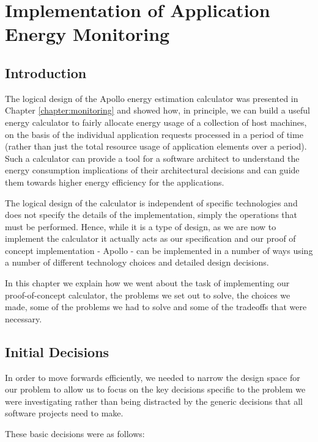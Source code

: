 \chapter{Implementation of Application Energy Monitoring}
\label{chapter:implementation}

\section{Introduction}
The logical design of the Apollo energy estimation calculator was presented in Chapter \ref{chapter:monitoring} and showed how, in principle, we can build a useful energy calculator to fairly allocate energy usage of a collection of host machines, on the basis of the individual application requests processed in a period of time (rather than just the total resource usage of application elements over a period).   Such a calculator can provide a tool for a software architect to understand the energy consumption implications of their architectural decisions and can guide them towards higher energy efficiency for the applications.

The logical design of the calculator is independent of specific technologies and does not specify the details of the implementation, simply the operations that must be performed.  Hence, while it is a type of design, as we are now to implement the calculator it actually acts as our specification and our proof of concept implementation - Apollo - can be implemented in a number of ways using a number of different technology choices and detailed design decisions.

In this chapter we explain how we went about the task of implementing our proof-of-concept calculator, the problems we set out to solve, the choices we made, some of the problems we had to solve and some of the tradeoffs that were necessary.

\section{Initial Decisions}

In order to move forwards efficiently, we needed to narrow the design space for our problem to allow us to focus on the key decisions specific to the problem we were investigating rather than being distracted by the generic decisions that all software projects need to make.

These basic decisions were as follows:

